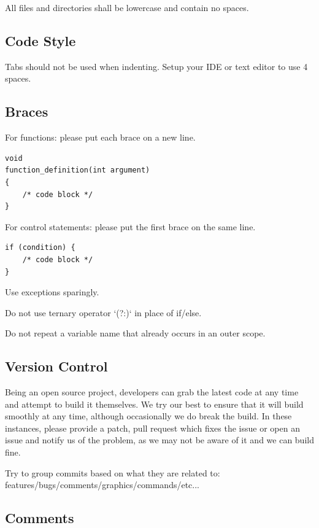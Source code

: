 \documentclass[11pt]{report}
\begin{document}
All files and directories shall be lowercase and contain no spaces.

\subsection{Code Style}

Tabs should not be used when indenting. Setup your IDE or text editor to use 4 spaces.

\subsection{Braces}

For functions: please put each brace on a new line.

\begin{lstlisting}
void
function_definition(int argument)
{
    /* code block */
}
\end{lstlisting}

For control statements: please put the first brace on the same line.

\begin{lstlisting}
if (condition) {
    /* code block */    
}
\end{lstlisting}

Use exceptions sparingly.

Do not use ternary operator `(?:)` in place of if/else.

Do not repeat a variable name that already occurs in an outer scope.

\subsection{Version Control}

Being an open source project, developers can grab the latest code at any time
and attempt to build it themselves. We try our best to ensure that it will build smoothly
at any time, although occasionally we do break the build. In these instances,
please provide a patch, pull request which fixes the issue or open an issue and
notify us of the problem, as we may not be aware of it and we can build fine.

Try to group commits based on what they are related to: features/bugs/comments/graphics/commands/etc...

\subsection{Comments}
\end{document}
